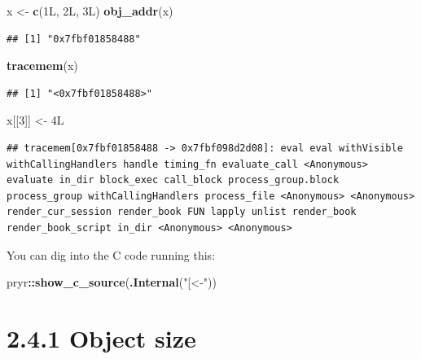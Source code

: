 \documentclass[]{book}
\newenvironment{Shaded}{\begin{snugshade}}{\end{snugshade}}
\newcommand{\DecValTok}[1]{\textcolor[rgb]{0.00,0.00,0.81}{#1}}
\newcommand{\KeywordTok}[1]{\textcolor[rgb]{0.13,0.29,0.53}{\textbf{#1}}}
\newcommand{\NormalTok}[1]{#1}
\newcommand{\OperatorTok}[1]{\textcolor[rgb]{0.81,0.36,0.00}{\textbf{#1}}}
\newcommand{\StringTok}[1]{\textcolor[rgb]{0.31,0.60,0.02}{#1}}
\begin{document}
\begin{Shaded}
\begin{Highlighting}[]
\NormalTok{x <-}\StringTok{ }\KeywordTok{c}\NormalTok{(1L, 2L, 3L)}
\KeywordTok{obj_addr}\NormalTok{(x)}
\end{Highlighting}
\end{Shaded}

\begin{verbatim}
## [1] "0x7fbf01858488"
\end{verbatim}

\begin{Shaded}
\begin{Highlighting}[]
\KeywordTok{tracemem}\NormalTok{(x)}
\end{Highlighting}
\end{Shaded}

\begin{verbatim}
## [1] "<0x7fbf01858488>"
\end{verbatim}

\begin{Shaded}
\begin{Highlighting}[]
\NormalTok{x[[}\DecValTok{3}\NormalTok{]] <-}\StringTok{ }\NormalTok{4L}
\end{Highlighting}
\end{Shaded}

\begin{verbatim}
## tracemem[0x7fbf01858488 -> 0x7fbf098d2d08]: eval eval withVisible withCallingHandlers handle timing_fn evaluate_call <Anonymous> evaluate in_dir block_exec call_block process_group.block process_group withCallingHandlers process_file <Anonymous> <Anonymous> render_cur_session render_book FUN lapply unlist render_book render_book_script in_dir <Anonymous> <Anonymous>
\end{verbatim}

You can dig into the C code running this:

\begin{Shaded}
\begin{Highlighting}[]
\NormalTok{pryr}\OperatorTok{::}\KeywordTok{show_c_source}\NormalTok{(}\KeywordTok{.Internal}\NormalTok{(}\StringTok{"[<-"}\NormalTok{))}
\end{Highlighting}
\end{Shaded}

\hypertarget{object-size}{%
\section*{2.4.1 Object size}\label{object-size}}
\end{document}
